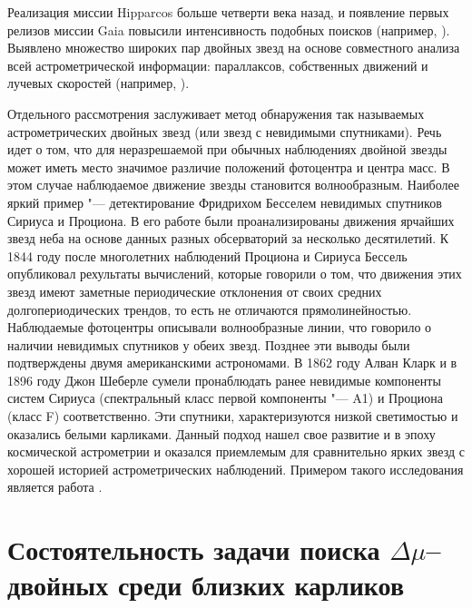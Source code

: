Реализация миссии Hipparcos больше четверти века назад, и появление первых релизов миссии Gaia повысили интенсивность подобных поисков (например, \cite{2018JDSO...14..367K}). Выявлено множество широких пар двойных звезд на основе совместного анализа всей астрометрической информации: параллаксов, собственных движений и лучевых скоростей (например, \cite{2019A&A...623A..72K}).

Отдельного рассмотрения заслуживает метод обнаружения так называемых астрометрических двойных звезд (или звезд с невидимыми спутниками). Речь идет о том, что для неразрешаемой при обычных наблюдениях двойной звезды может иметь место значимое различие положений фотоцентра и центра масс. В этом случае наблюдаемое движение звезды становится волнообразным. Наиболее яркий пример "--- детектирование Фридрихом Бесселем невидимых спутников Сириуса и Проциона. В его работе были проанализированы движения ярчайших звезд неба на основе данных разных обсерваторий за несколько десятилетий. К 1844 году после многолетних наблюдений Проциона и Сириуса Бессель опубликовал рехультаты вычислений, которые говорили о том, что движения этих звезд имеют заметные периодические отклонения от своих средних долгопериодических трендов, то есть не отличаются прямолинейностью. Наблюдаемые фотоцентры описывали волнообразные линии, что говорило о наличии невидимых спутников у обеих звезд. Позднее эти выводы были подтверждены двумя американскими астрономами. В 1862 году Алван Кларк и в 1896 году Джон Шеберле сумели пронаблюдать ранее невидимые компоненты систем Сириуса (спектральный класс первой компоненты "--- A1) и Проциона (класс F) соответственно. Эти спутники, характеризуются низкой светимостью и оказались белыми карликами. Данный подход нашел свое развитие и в эпоху космической астрометрии и оказался приемлемым для сравнительно ярких звезд с хорошей историей астрометрических наблюдений. Примером такого исследования является работа \cite{2002A&A...391..647G}.

\section{Состоятельность задачи поиска $\Delta\mu$--двойных среди близких карликов}\label{sec:ch1/sectN2}
